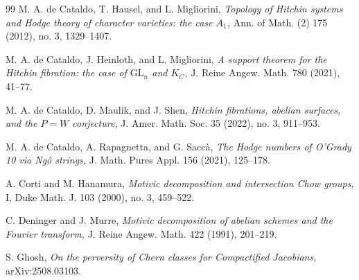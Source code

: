 \documentclass[11pt]{amsart}
\theoremstyle{plain}
\theoremstyle{definition}
\theoremstyle{remark}
\begin{document}
\begin{thebibliography}{99}
 {M. A. de Cataldo}, {T. Hausel}, and {L. Migliorini}, {\em Topology of Hitchin systems and Hodge theory of character varieties: the case $A_1$,} Ann. of Math. (2) 175 (2012), no. 3, 1329--1407.

 M. A. de Cataldo, J. Heinloth, and L. Migliorini, {\em A support theorem for the Hitchin fibration: the case of $\mathrm{GL}_n$ and $K_C$,} J. Reine Angew. Math. 780 (2021), 41--77.


 M. A. de Cataldo, D. Maulik, and J. Shen, {\em Hitchin fibrations, abelian surfaces, and the $P = W$ conjecture,} J. Amer. Math. Soc. 35 (2022), no. 3, 911--953.


 M. A. de Cataldo, A. Rapagnetta, and G. Sacc\`a, {\em The Hodge numbers of O’Grady 10 via Ng\^o strings,} J. Math. Pures Appl. 156 (2021), 125--178.

 A. Corti and M. Hanamura, {\em Motivic decomposition and intersection Chow groups,} I, Duke Math. J. 103 (2000), no. 3, 459--522.

 C. Deninger and J. Murre, {\em Motivic decomposition of abelian schemes and the Fourier transform,} J. Reine Angew. Math. 422 (1991), 201--219.


 S. Ghosh, {\em On the perversity of Chern classes for Compactified Jacobians,} arXiv:2508.03103.





\end{thebibliography}
\end{document}
